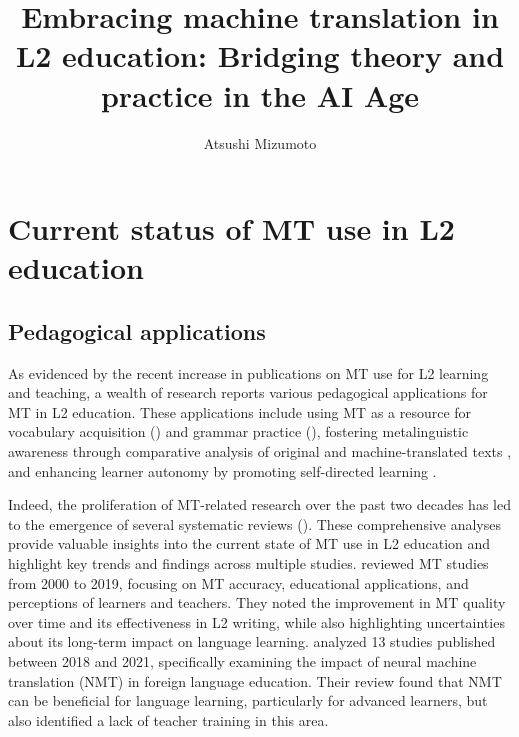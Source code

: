 \documentclass[output=paper]{langscibook}
\author{Atsushi Mizumoto\orcid{}\affiliation{Kansai University, Japan}}
\title[Embracing machine translation in L2 education:]{Embracing machine translation in L2 education: Bridging theory and practice in the AI Age}
\begin{document}
\maketitle 



\section{Current status of MT use in L2 education}

\subsection{Pedagogical applications}

As evidenced by the recent increase in publications on MT use for L2 learning and teaching, a wealth of research reports various pedagogical applications for MT in L2 education. These applications include using MT as a resource for vocabulary acquisition (\citealt{lo23_NMT-EFL,lo24}) and grammar practice (\citealt{leekang24}), fostering metalinguistic awareness through comparative analysis of original and machine-translated texts \citep{tsai2019}, and enhancing learner autonomy by promoting self-directed learning \citep{lee20}.

Indeed, the proliferation of MT-related research over the past two decades has led to the emergence of several systematic reviews (\citealt{jolley22, klimova22, lee23, ohashi2024}). These comprehensive analyses provide valuable insights into the current state of MT use in L2 education and highlight key trends and findings across multiple studies. \citet{jolley22} reviewed MT studies from 2000 to 2019, focusing on MT accuracy, educational applications, and perceptions of learners and teachers. They noted the improvement in MT quality over time and its effectiveness in L2 writing, while also highlighting uncertainties about its long-term impact on language learning. \citet{klimova22} analyzed 13 studies published between 2018 and 2021, specifically examining the impact of neural machine translation (NMT) in foreign language education. Their review found that NMT can be beneficial for language learning, particularly for advanced learners, but also identified a lack of teacher training in this area.
\end{document}
